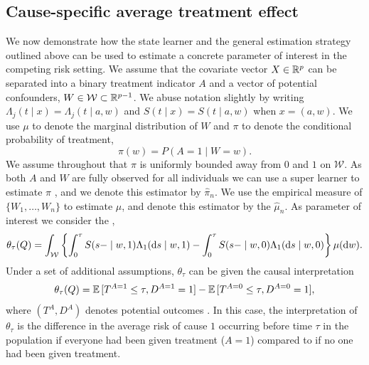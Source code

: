 \documentclass[a4,danish]{article}
\begin{document}
\subsection{Cause-specific average treatment effect}
\label{sec:cause-spec-aver}

We now demonstrate how the state learner and the general estimation strategy
outlined above can be used to estimate a concrete parameter of interest in the
competing risk setting. We assume that the covariate vector \( X \in \mathbb{R}^p \) can
be separated into a binary treatment indicator \( A \) and a vector of potential
confounders, \( W \in \mathcal{W}\subset \mathbb{R}^{p-1} \). We abuse notation slightly
by writing \( \Lambda_j(t \mid x) = \Lambda_j(t \mid a, w) \) and
\( S(t \mid x) = S(t \mid a, w) \) when \( x=(a, w) \). We use $\mu$ to denote
the marginal distribution of \( W \) and $\pi$ to denote the conditional
probability of treatment,
\begin{equation*}
  \pi(w) = P(A=1 \mid W=w).
\end{equation*}
We assume throughout that $\pi$ is uniformly bounded away from \( 0 \) and
\( 1 \) on \( \mathcal{W} \). As both \( A \) and \( W \) are fully observed for
all individuals we can use a super learner to estimate $\pi$
, and we denote this estimator by $\hat{\pi}_n$. We use the
empirical measure of \( \{W_1, \dots, W_n\} \) to estimate $\mu$, and denote
this estimator by the $\hat{\mu}_n$. As parameter of interest we consider the
,
\begin{equation*}
  \theta_{{\tau}}(Q) = \int_{\mathcal{W}} 
  \left\{
    \int_0^{\tau}
    S(s- \mid w, 1)  \Lambda_1(\mathop{}\!\mathrm{d} s \mid w, 1)
    -
    \int_0^{\tau}
    S(s- \mid w, 0)  \Lambda_1(\mathop{}\!\mathrm{d} s \mid w, 0)
  \right\}
  \mu(\mathop{}\!\mathrm{d} w).
\end{equation*}
Under a set of
additional assumptions, \( \theta_{{\tau}} \) can be given the causal
interpretation
\begin{equation*}
  \theta_{{\tau}}(Q) =
  \operatorname{\mathbb{E}}{[T^{A=1} \leq \tau, D^{A=1}=1]}-
  \operatorname{\mathbb{E}}{[T^{A=0} \leq \tau, D^{A=0}=1]},
\end{equation*}
where \( (T^A, D^A) \) denotes potential outcomes \citep{hernanRobinsWhatIf}. In
this case, the interpretation of $\theta_{\tau}$ is the difference in the
average risk of cause \( 1 \) occurring before time \( \tau \) in the population
if everyone had been given treatment (\( A=1 \)) compared to if no one had been
given treatment.
\end{document}

